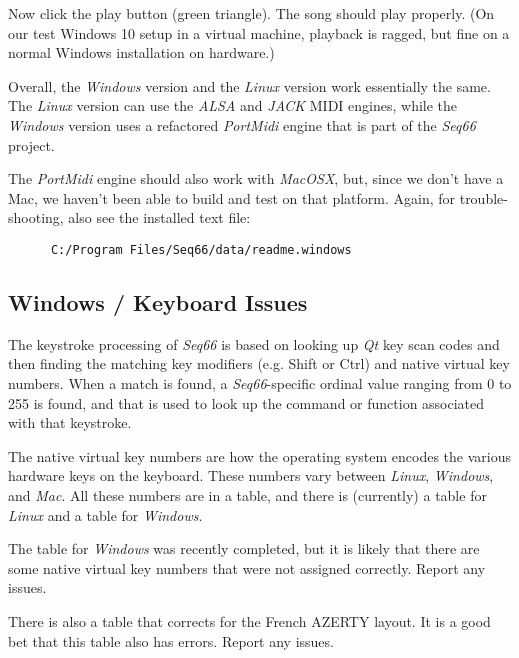    Now click the play button (green triangle).
   The song should play properly.
   (On our test Windows 10 setup in a virtual machine, playback is ragged,
   but fine on a normal Windows installation on hardware.)

   Overall, the \textsl{Windows} version and the \textsl{Linux} version
   work essentially the same. The \textsl{Linux} version can use the
   \textsl{ALSA} and \textsl{JACK} MIDI engines, while the \textsl{Windows}
   version uses a refactored \textsl{PortMidi} engine that is part of the
   \textsl{Seq66} project.

   The \textsl{PortMidi} engine should also work with \textsl{MacOSX}, but,
   since we don't have a Mac, we haven't been able to build and test
   on that platform.
   Again, for trouble-shooting, also see the installed text file:

   \begin{verbatim}
      C:/Program Files/Seq66/data/readme.windows
   \end{verbatim}

\subsection{Windows / Keyboard Issues}
\label{subsec:windows_keyboard_issues}

   The keystroke processing of \textsl{Seq66} is based on looking up
   \textsl{Qt} key scan codes and then finding the matching key modifiers (e.g.
   Shift or Ctrl) and native virtual key numbers.
   When a match is found, a \textsl{Seq66}-specific ordinal value ranging from
   0 to 255 is found, and that is used to look up the command or function
   associated with that keystroke.

   The native virtual key numbers are how the operating system
   encodes the various hardware keys on the keyboard.
   These numbers vary between
   \textsl{Linux},
   \textsl{Windows}, and
   \textsl{Mac}.
   All these numbers are in a table, and there is (currently)
   a table for \textsl{Linux} and a table for \textsl{Windows}.

   The table for \textsl{Windows} was recently completed, but
   it is likely that there are some native virtual key numbers
   that were not assigned correctly.
   Report any issues.

   There is also a table that corrects for
   the French AZERTY layout.
   It is a good bet that this table also has errors.
   Report any issues.

